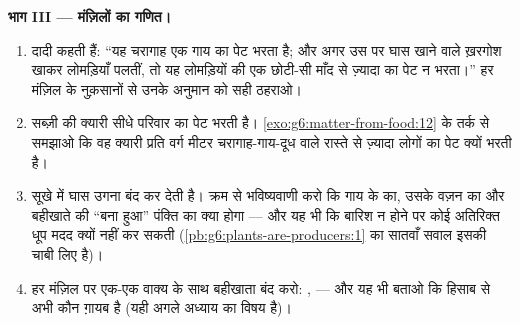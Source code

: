 \begin{problem}[{सप्ताहांत समस्या --- एक छोटे खेत की जाँच, खेत से मेज़
तक}]
\medskip\noindent\textbf{भाग III --- मंज़िलों का गणित।}
\begin{enumerate}[resume]
  \item दादी कहती हैं: ``यह चरागाह एक गाय का पेट भरता है; और अगर उस
        पर घास खाने वाले ख़रगोश खाकर लोमड़ियाँ पलतीं, तो यह लोमड़ियों
        की एक छोटी-सी माँद से ज़्यादा का पेट न भरता।'' हर मंज़िल के
        नुक़सानों से उनके अनुमान को सही ठहराओ।
  \item सब्ज़ी की क्यारी सीधे परिवार का पेट भरती है।
        \cref{exo:g6:matter-from-food:12} के तर्क से समझाओ कि वह
        क्यारी प्रति वर्ग मीटर चरागाह-गाय-दूध वाले रास्ते से ज़्यादा
        लोगों का पेट क्यों भरती है।
  \item सूखे में घास उगना बंद कर देती है। क्रम से भविष्यवाणी करो कि
        गाय के  का, उसके वज़न का और बहीखाते की ``बना हुआ'' पंक्ति
        का क्या होगा --- और यह भी कि बारिश न होने पर कोई अतिरिक्त धूप
        मदद क्यों नहीं कर सकती
        (\cref{pb:g6:plants-are-producers:1} का सातवाँ सवाल इसकी
        चाबी लिए है)।
  \item हर मंज़िल पर एक-एक वाक्य के साथ बहीखाता बंद करो: ,
         --- और यह भी बताओ कि हिसाब से अभी कौन ग़ायब है
        (यही अगले अध्याय का विषय है)।
\end{enumerate}
\end{problem}
